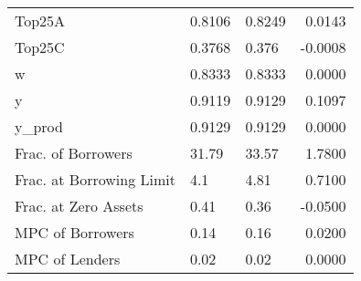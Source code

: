 \begin{table}
\begin{tabular}{lllr}
                  Top25A &  0.8106 &   0.8249 &  0.0143 \\
                  Top25C &  0.3768 &    0.376 & -0.0008 \\
                       w &  0.8333 &   0.8333 &  0.0000 \\
                       y &  0.9119 &   0.9129 &  0.1097 \\
                  y\_prod &  0.9129 &   0.9129 &  0.0000 \\
      Frac. of Borrowers &   31.79 &    33.57 &  1.7800 \\
Frac. at Borrowing Limit &     4.1 &     4.81 &  0.7100 \\
    Frac. at Zero Assets &    0.41 &     0.36 & -0.0500 \\
        MPC of Borrowers &    0.14 &     0.16 &  0.0200 \\
          MPC of Lenders &    0.02 &     0.02 &  0.0000 \\
\bottomrule
\end{tabular}
\end{table}
